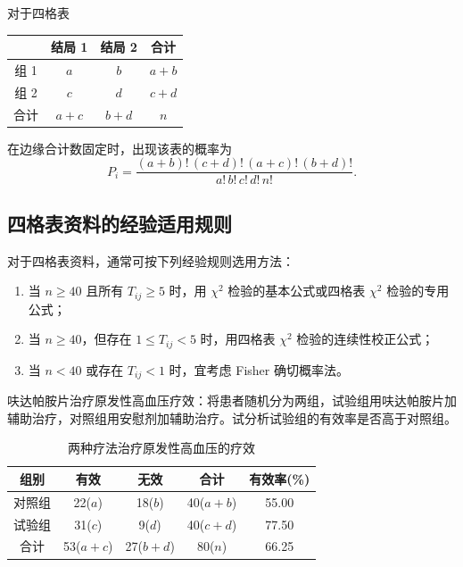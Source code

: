 \documentclass[lang=cn,10pt]{elegantbook}
\begin{document}
对于四格表
\begin{center}
\begin{tabular}{cccc}
  \hline
  & 结局 1 & 结局 2 & 合计\\
  \hline
  组 1 & $a$ & $b$ & $a+b$\\
  组 2 & $c$ & $d$ & $c+d$\\
  \hline
  合计 & $a+c$ & $b+d$ & $n$\\
  \hline
\end{tabular}
\end{center}

在边缘合计数固定时，出现该表的概率为
\begin{equation}
  P_i=\frac{(a+b)!\,(c+d)!\,(a+c)!\,(b+d)!}{a!\,b!\,c!\,d!\,n!}.
\end{equation}

\subsection{四格表资料的经验适用规则}
对于四格表资料，通常可按下列经验规则选用方法：
\begin{enumerate}
  \item 当 $n\ge 40$ 且所有 $T_{ij}\ge 5$ 时，用 $\chi^2$ 检验的基本公式或四格表 $\chi^2$ 检验的专用公式；
  \item 当 $n\ge 40$，但存在 $1\le T_{ij}<5$ 时，用四格表 $\chi^2$ 检验的连续性校正公式；
  \item 当 $n<40$ 或存在 $T_{ij}<1$ 时，宜考虑 Fisher 确切概率法。
\end{enumerate}

\vspace{0.2cm}
\begin{exercise}
呋达帕胺片治疗原发性高血压疗效：将患者随机分为两组，试验组用呋达帕胺片加辅助治疗，对照组用安慰剂加辅助治疗。试分析试验组的有效率是否高于对照组。

\begin{table}[htbp]
\centering
\caption*{两种疗法治疗原发性高血压的疗效}
\begin{tabular}{ccccc}
  \hline
  组别 & 有效 & 无效 & 合计 & 有效率(\%) \\
  \hline
  对照组 & 22($a$) & 18($b$) & 40($a+b$) & 55.00 \\
  试验组 & 31($c$) & 9($d$)  & 40($c+d$) & 77.50 \\
  \hline
  合计 & 53($a+c$) & 27($b+d$) & 80($n$) & 66.25 \\
  \hline
\end{tabular}
\end{table}
\end{exercise}
\end{document}
